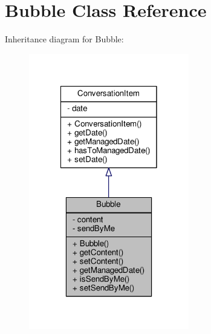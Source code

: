 \hypertarget{a00004}{\section{Bubble Class Reference}
\label{a00004}
}


Inheritance diagram for Bubble\+:
\nopagebreak
\begin{figure}[H]
\begin{center}
\leavevmode
\includegraphics[width=198pt]{a00059}
\end{center}
\end{figure}


